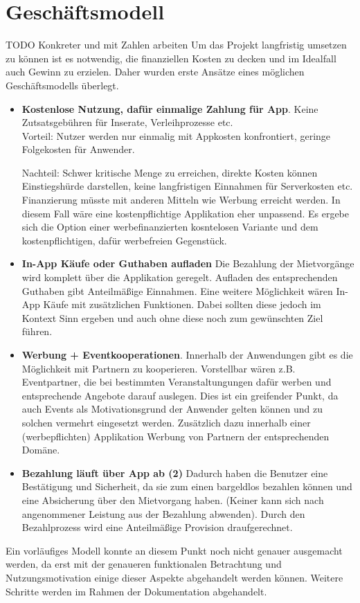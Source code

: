 
\section{Geschäftsmodell}

TODO Konkreter und mit Zahlen arbeiten
Um das Projekt langfristig umsetzen zu können ist es notwendig, die finanziellen Kosten zu decken und im Idealfall auch Gewinn zu erzielen. 
Daher wurden erste Ansätze eines möglichen Geschäftsmodells überlegt.

\begin{itemize}
   \item \textbf{Kostenlose Nutzung, dafür einmalige Zahlung für App}. Keine Zutsatsgebühren für Inserate, Verleihprozesse etc.\\
   Vorteil: Nutzer werden nur einmalig mit Appkosten konfrontiert, geringe Folgekosten für Anwender.

   Nachteil: Schwer kritische Menge zu erreichen, direkte Kosten können Einstiegshürde darstellen, keine langfristigen Einnahmen für Serverkosten etc. Finanzierung müsste mit anderen Mitteln wie Werbung erreicht werden. In diesem Fall wäre eine kostenpflichtige Applikation eher unpassend. Es ergebe sich die Option einer werbefinanzierten kosntelosen Variante und dem kostenpflichtigen, dafür werbefreien Gegenstück.

   \item \textbf{In-App Käufe oder Guthaben aufladen} 
   Die Bezahlung der Mietvorgänge wird komplett über die Applikation geregelt. Aufladen des entsprechenden Guthaben gibt Anteilmäßige Einnahmen. Eine weitere Möglichkeit wären In-App Käufe mit zusätzlichen Funktionen. Dabei sollten diese jedoch im Kontext Sinn ergeben und auch ohne diese noch zum gewünschten Ziel führen. 

   \item \textbf{Werbung + Eventkooperationen}.
   Innerhalb der Anwendungen gibt es die Möglichkeit mit Partnern zu kooperieren. Vorstellbar wären z.B. Eventpartner, die bei bestimmten Veranstaltungungen dafür werben und entsprechende Angebote darauf auslegen. Dies ist ein greifender Punkt, da auch Events als Motivationsgrund der Anwender gelten können und zu solchen vermehrt eingesetzt werden. Zusätzlich dazu innerhalb einer (werbepflichten) Applikation Werbung von Partnern der entsprechenden Domäne.

   \item \textbf{Bezahlung läuft über App ab (2)} 
   Dadurch haben die Benutzer eine Bestätigung und Sicherheit, da sie zum einen bargeldlos bezahlen können und eine Absicherung über den Mietvorgang haben. (Keiner kann sich nach angenommener Leistung aus der Bezahlung abwenden). Durch den Bezahlprozess wird eine Anteilmäßige Provision draufgerechnet. 

\end{itemize}
 
Ein vorläufiges Modell konnte an diesem Punkt noch nicht genauer ausgemacht werden, da erst mit der genaueren funktionalen Betrachtung und Nutzungsmotivation einige dieser Aspekte abgehandelt werden können. Weitere Schritte werden im Rahmen der Dokumentation abgehandelt.